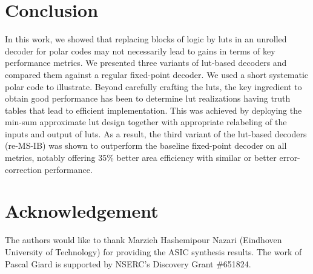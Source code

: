 \documentclass[conference,letterpaper]{IEEEtran}
\begin{document}
\section{Conclusion}\label{sec:conclusion}
In this work, we showed that replacing blocks of logic by \glspl{lut} in an unrolled decoder for polar codes may not necessarily lead to gains in terms of key performance metrics. We presented three variants of \gls{lut}-based decoders and compared them against a regular fixed-point decoder. We used a short systematic polar code to illustrate. Beyond carefully crafting the \glspl{lut}, the key ingredient to obtain good performance has been to determine \gls{lut} realizations having  truth tables that lead to efficient implementation. This was achieved by deploying the min-sum approximate \gls{lut} design together with appropriate relabeling of the inputs and output of \glspl{lut}. As a result, the third variant of the \gls{lut}-based decoders (re-MS-IB) was shown to outperform the baseline fixed-point decoder on all metrics, notably offering 35\% better area efficiency with similar or better error-correction performance.

\section*{Acknowledgement}
The authors would like to thank Marzieh Hashemipour Nazari (Eindhoven University of Technology) for providing the ASIC synthesis results. The work of Pascal Giard is supported by NSERC's Discovery Grant \#651824.



\end{document}
